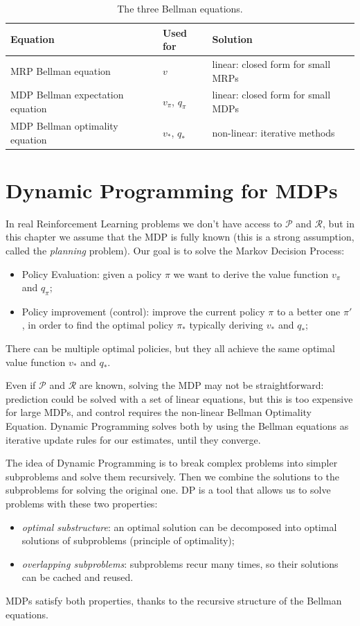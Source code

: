 \begin{table}[H]
\centering
\begin{tabular}{@{}l l p{4.2cm}@{}}
\toprule
\textbf{Equation} & \textbf{Used for} & \textbf{Solution} \\
\midrule
MRP Bellman equation & $v$ & linear: closed form for small MRPs \\
MDP Bellman expectation equation & $v_\pi$, $q_\pi$ & linear: closed form for small MDPs \\
MDP Bellman optimality equation & $v_*$, $q_*$ & non-linear: iterative methods \\
\bottomrule
\end{tabular}
\caption{The three Bellman equations.}
\label{tab:bellman-eqs}
\end{table}

\section{Dynamic Programming for MDPs}
In real Reinforcement Learning problems we don't have access to $\mathcal{P}$ and $\mathcal{R}$, but in this chapter we assume that the MDP is fully known (this is a strong assumption, called the \textit{planning} problem).
Our goal is to solve the Markov Decision Process:
\begin{itemize}
    \item Policy Evaluation: given a policy $\pi$ we want to derive the value function $v_\pi$ and $q_\pi$;
    \item Policy improvement (control): improve the current policy $\pi$ to a better one $\pi'$, in order to find the optimal policy $\pi_*$ typically deriving $v_*$ and $q_*$;
\end{itemize}
There can be multiple optimal policies, but they all achieve the same optimal value function $v_*$ and $q_*$.

Even if $\mathcal{P}$ and $\mathcal{R}$ are known, solving the MDP may not be straightforward: prediction could be solved with a set of linear equations, but this is too expensive for large MDPs, and control requires the non-linear Bellman Optimality Equation. Dynamic Programming solves both by using the Bellman equations as iterative update rules for our estimates, until they converge.

The idea of Dynamic Programming is to break complex problems into simpler subproblems and solve them recursively. Then we combine the solutions to the subproblems for solving the original one.
DP is a tool that allows us to solve problems with these two properties:
\begin{itemize}
    \item \textit{optimal substructure}: an optimal solution can be decomposed into optimal solutions of subproblems (principle of optimality);
    \item \textit{overlapping subproblems}: subproblems recur many times, so their solutions can be cached and reused.
\end{itemize}
MDPs satisfy both properties, thanks to the recursive structure of the Bellman equations.

